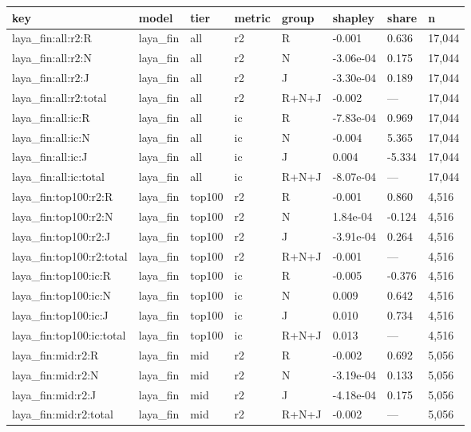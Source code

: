\begin{tabular}{llllllll}
\toprule
key & model & tier & metric & group & shapley & share & n \\
\midrule
laya\_fin:all:r2:R & laya\_fin & all & r2 & R & -0.001 & 0.636 & 17,044 \\
laya\_fin:all:r2:N & laya\_fin & all & r2 & N & -3.06e-04 & 0.175 & 17,044 \\
laya\_fin:all:r2:J & laya\_fin & all & r2 & J & -3.30e-04 & 0.189 & 17,044 \\
laya\_fin:all:r2:total & laya\_fin & all & r2 & R+N+J & -0.002 & — & 17,044 \\
laya\_fin:all:ic:R & laya\_fin & all & ic & R & -7.83e-04 & 0.969 & 17,044 \\
laya\_fin:all:ic:N & laya\_fin & all & ic & N & -0.004 & 5.365 & 17,044 \\
laya\_fin:all:ic:J & laya\_fin & all & ic & J & 0.004 & -5.334 & 17,044 \\
laya\_fin:all:ic:total & laya\_fin & all & ic & R+N+J & -8.07e-04 & — & 17,044 \\
laya\_fin:top100:r2:R & laya\_fin & top100 & r2 & R & -0.001 & 0.860 & 4,516 \\
laya\_fin:top100:r2:N & laya\_fin & top100 & r2 & N & 1.84e-04 & -0.124 & 4,516 \\
laya\_fin:top100:r2:J & laya\_fin & top100 & r2 & J & -3.91e-04 & 0.264 & 4,516 \\
laya\_fin:top100:r2:total & laya\_fin & top100 & r2 & R+N+J & -0.001 & — & 4,516 \\
laya\_fin:top100:ic:R & laya\_fin & top100 & ic & R & -0.005 & -0.376 & 4,516 \\
laya\_fin:top100:ic:N & laya\_fin & top100 & ic & N & 0.009 & 0.642 & 4,516 \\
laya\_fin:top100:ic:J & laya\_fin & top100 & ic & J & 0.010 & 0.734 & 4,516 \\
laya\_fin:top100:ic:total & laya\_fin & top100 & ic & R+N+J & 0.013 & — & 4,516 \\
laya\_fin:mid:r2:R & laya\_fin & mid & r2 & R & -0.002 & 0.692 & 5,056 \\
laya\_fin:mid:r2:N & laya\_fin & mid & r2 & N & -3.19e-04 & 0.133 & 5,056 \\
laya\_fin:mid:r2:J & laya\_fin & mid & r2 & J & -4.18e-04 & 0.175 & 5,056 \\
laya\_fin:mid:r2:total & laya\_fin & mid & r2 & R+N+J & -0.002 & — & 5,056 \\

\end{tabular}
